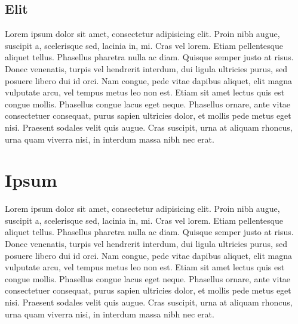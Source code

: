 \documentclass{mini}
\begin{document}
\section{Elit}

Lorem ipsum dolor sit amet, consectetur adipisicing elit. Proin nibh augue, suscipit a, scelerisque sed, lacinia in, mi. Cras vel lorem. Etiam pellentesque aliquet tellus. Phasellus pharetra nulla ac diam. Quisque semper justo at risus. Donec venenatis, turpis vel hendrerit interdum, dui ligula ultricies purus, sed posuere libero dui id orci. Nam congue, pede vitae dapibus aliquet, elit magna vulputate arcu, vel tempus metus leo non est. Etiam sit amet lectus quis est congue mollis. Phasellus congue lacus eget neque. Phasellus ornare, ante vitae consectetuer consequat, purus sapien ultricies dolor, et mollis pede metus eget nisi. Praesent sodales velit quis augue. Cras suscipit, urna at aliquam rhoncus, urna quam viverra nisi, in interdum massa nibh nec erat.

\appendix

\chapter{Ipsum}

Lorem ipsum dolor sit amet, consectetur adipisicing elit. Proin nibh augue, suscipit a, scelerisque sed, lacinia in, mi. Cras vel lorem. Etiam pellentesque aliquet tellus. Phasellus pharetra nulla ac diam. Quisque semper justo at risus. Donec venenatis, turpis vel hendrerit interdum, dui ligula ultricies purus, sed posuere libero dui id orci. Nam congue, pede vitae dapibus aliquet, elit magna vulputate arcu, vel tempus metus leo non est. Etiam sit amet lectus quis est congue mollis. Phasellus congue lacus eget neque. Phasellus ornare, ante vitae consectetuer consequat, purus sapien ultricies dolor, et mollis pede metus eget nisi. Praesent sodales velit quis augue. Cras suscipit, urna at aliquam rhoncus, urna quam viverra nisi, in interdum massa nibh nec erat.

\makestatement
\end{document}
